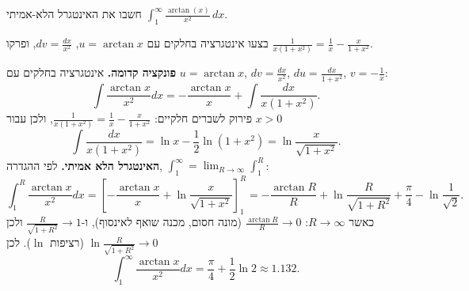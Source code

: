 
\begin{question}
חשבו את האינטגרל הלא-אמיתי $\displaystyle\int_1^\infty\frac{\arctan(x)}{x^2}\,dx$.
\end{question}

\begin{hint}
בצעו אינטגרציה בחלקים עם $u=\arctan x$, $dv=\frac{dx}{x^2}$, ופרקו $\frac{1}{x(1+x^2)}=\frac1x-\frac{x}{1+x^2}$.
\end{hint}

\begin{solution}
\textbf{פונקציה קדומה.} אינטגרציה בחלקים עם $u=\arctan x$, $dv=\frac{dx}{x^2}$, $du=\frac{dx}{1+x^2}$, $v=-\frac1x$:
\[
\int\frac{\arctan x}{x^2}dx=-\frac{\arctan x}{x}+\int\frac{dx}{x(1+x^2)}.
\]
פירוק לשברים חלקיים: $\frac{1}{x(1+x^2)}=\frac1x-\frac{x}{1+x^2}$, ולכן עבור $x>0$
\[
\int\frac{dx}{x(1+x^2)}=\ln x-\frac12\ln(1+x^2)=\ln\frac{x}{\sqrt{1+x^2}}.
\]
\textbf{האינטגרל הלא אמיתי.} לפי ההגדרה, $\int_1^\infty=\lim_{R\to\infty}\int_1^R$:
\[
\int_1^R\frac{\arctan x}{x^2}dx=\left[-\frac{\arctan x}{x}+\ln\frac{x}{\sqrt{1+x^2}}\right]_1^R
=-\frac{\arctan R}{R}+\ln\frac{R}{\sqrt{1+R^2}}+\frac\pi4-\ln\frac1{\sqrt2}.
\]
כאשר $R\to\infty$: $\frac{\arctan R}{R}\to0$ (מונה חסום, מכנה שואף לאינסוף), ו-$\frac{R}{\sqrt{1+R^2}}\to1$ ולכן $\ln\frac{R}{\sqrt{1+R^2}}\to0$ (רציפות $\ln$). לכן
\[
\int_1^\infty\frac{\arctan x}{x^2}dx=\frac\pi4+\frac12\ln2\approx1.132.
\]
\end{solution}
